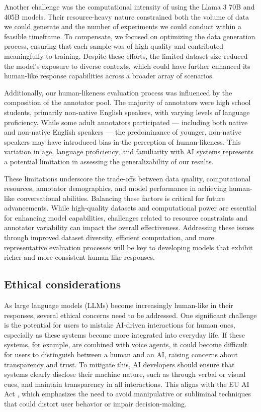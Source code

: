 \documentclass{article}
\begin{document}
Another challenge was the computational intensity of using the Llama 3 70B and 405B models. Their resource-heavy nature constrained both the volume of data we could generate and the number of experiments we could conduct within a feasible timeframe. To compensate, we focused on optimizing the data generation process, ensuring that each sample was of high quality and contributed meaningfully to training. Despite these efforts, the limited dataset size reduced the model's exposure to diverse contexts, which could have further enhanced its human-like response capabilities across a broader array of scenarios.

Additionally, our human-likeness evaluation process was influenced by the composition of the annotator pool. The majority of annotators were high school students, primarily non-native English speakers, with varying levels of language proficiency. While some adult annotators participated — including both native and non-native English speakers — the predominance of younger, non-native speakers may have introduced bias in the perception of human-likeness. This variation in age, language proficiency, and familiarity with AI systems represents a potential limitation in assessing the generalizability of our results.

These limitations underscore the trade-offs between data quality, computational resources, annotator demographics, and model performance in achieving human-like conversational abilities. Balancing these factors is critical for future advancements. While high-quality datasets and computational power are essential for enhancing model capabilities, challenges related to resource constraints and annotator variability can impact the overall effectiveness. Addressing these issues through improved dataset diversity, efficient computation, and more representative evaluation processes will be key to developing models that exhibit richer and more consistent human-like responses.


\subsection{Ethical considerations}
\label{sec:ethical_cons}

As large language models (LLMs) become increasingly human-like in their responses, several ethical concerns need to be addressed. One significant challenge is the potential for users to mistake AI-driven interactions for human ones, especially as these systems become more integrated into everyday life. If these systems, for example, are combined with voice agents, it could become difficult for users to distinguish between a human and an AI, raising concerns about transparency and trust. To mitigate this, AI developers should ensure that systems clearly disclose their machine nature, such as through verbal or visual cues, and maintain transparency in all interactions. This aligns with the EU AI Act \cite{eurlex_ai_act}, which emphasizes the need to avoid manipulative or subliminal techniques that could distort user behavior or impair decision-making.
\end{document}
